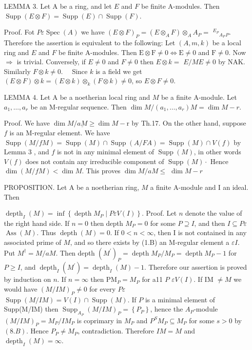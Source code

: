 LEMMA 3. Let A be a ring, and let $E$ and $F$ be finite A-modules. Then $\operatorname{Supp}(E \otimes F)=\operatorname{Supp}(E) \cap \operatorname{Supp}(F)$.

Proof. Fot $P \varepsilon \operatorname{Spec}(A)$ we have $(E \otimes F)_{P}=\left(E \otimes_{A} F\right) \otimes_{A} A_{P}=$ ${ }^{E_{P}}{ }_{A_{P}}{ }_{P}$. Therefore the assertion is equivalent to the following: Let $(A, m, k)$ be a local ring and $E$ and $F$ be finite A-modules. Then $\mathrm{E} \otimes \mathrm{F} \neq 0 \Longleftrightarrow \mathrm{E} \neq 0$ and $\mathrm{F} \neq 0$. Now $\Rightarrow$ is trivial. Conversely, if $E \neq 0$ and $F \neq 0$ then $E \otimes k=$ $E / M E \neq 0$ by NAK. Similarly $F \otimes k \neq 0 . \quad$ Since $k$ is a field we get $(E \otimes F) \otimes k=(E \otimes k) \otimes_{k}(F \otimes k) \neq 0$, so $E \otimes F \neq 0$.

LEMMA 4. Let A be a noetherian local ring and $M$ be a finite A-module. Let $a_{1}, \ldots, a_{r}$ be an M-regular sequence. Then $\operatorname{dim} M /\left(a_{1}, \ldots, a_{r}\right) M=\operatorname{dim} M-r .$

Proof. We have $\operatorname{dim} M / \underline{a M} \geqslant \operatorname{dim} M-\mathrm{r}$ by Th.17. On the other hand, suppose $f$ is an M-regular element. We have $\operatorname{Supp}(M / f M)=\operatorname{Supp}(M) \cap \operatorname{Supp}(A / F A)=\operatorname{Supp}(M) \cap V(f)$ by Lemma 3 , and $f$ is not in any minimal element of $\operatorname{Supp}(M)$, in other words $V(f)$ does not contain any irreducible component of $\operatorname{Supp}(M) \cdot$ Hence $\operatorname{dim}(M / f M)<\operatorname{dim} M .$ This proves $\operatorname{dim} M / a M \leqslant$ $\operatorname{dim} M-r$

PROPOSITION. Let A be a noetherian ring, $M$ a finite A-module and I an ideal. Then

$\operatorname{depth}_{I}(M)=\inf \left\{\operatorname{depth} M_{P} \mid P \varepsilon V(I)\right\} .$ Proof. Let $n$ denote the value of the right hand side. If $n=0$ then depth $M_{P}=0$ for some $P \supseteq I$, and then $I \subseteq P \varepsilon$ $\operatorname{Ass}(M)$. Thus $\operatorname{depth}(M)=0 .$ If $0<n<\infty$, then I is not contained in any associated prime of $M$, and so there exists by (1.B) an M-regular element a $\varepsilon I .$ Put $M^{\dagger}=M / a M .$ Then depth $\left(M^{\prime}\right)_{P}=\operatorname{depth} M_{P} / M_{P}=\operatorname{depth} M_{P}-1$ for $P \geq I$, and $\operatorname{depth}_{I}\left(M^{\prime}\right)=\operatorname{depth}_{I}(M)-1$. Therefore our assertion is proved by induction on $n$. If $n=\infty$ then $\mathrm{PM}_{P}=M_{P}$ for a11 $P$ $\varepsilon V(I)$. If IM $\neq M$ we would have $(M / I M)_{P} \neq 0$ for every $P \varepsilon$ $\operatorname{Supp}(M / I M)=V(I) \cap \operatorname{Supp}(M)$. If $P$ is a minimal element of Supp(M/IM) then $\operatorname{Supp}_{A_{P}}(M / I M)_{P}=\left\{P_{P}\right\}$, hence the $A_{P}$-module $(M / I M)_{P}=M_{P} / I M_{P}$ is coprimary in $M_{P}$ and $P^{S} M_{P} \subseteq M_{P}$ for some $s>0$ by $(8 . B)$. Hence $P_{P} \neq M_{P}$, contradiction. Therefore $I M=M$ and $\operatorname{depth}_{I}(M)=\infty$.



